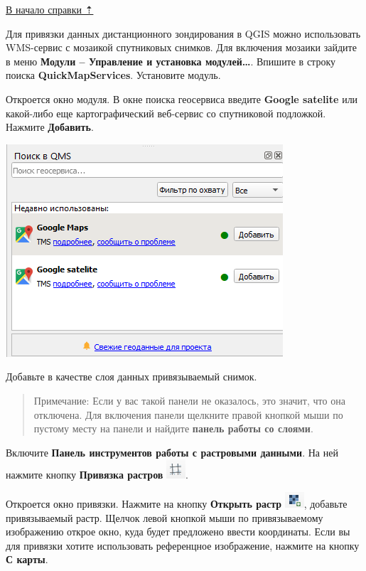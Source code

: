 \documentclass[
  12pt,
]{book}
\begin{document}
\protect\hyperlink{georeference}{В начало справки ⇡}

Для привязки данных дистанционного зондирования в QGIS можно использовать WMS-сервис с мозаикой спутниковых снимков. Для включения мозаики зайдите в меню \textbf{Модули -- Управление и установка модулей\ldots{}}. Впишите в строку поиска \textbf{QuickMapServices}. Установите модуль.

Откроется окно модуля. В окне поиска геосервиса введите \textbf{Google satelite} или какой-либо еще картографический веб-сервис со спутниковой подложкой. Нажмите \textbf{Добавить}.

\includegraphics{images/Ref02/QMS.png}

Добавьте в качестве слоя данных привязываемый снимок.

\begin{quote}
Примечание: Если у вас такой панели не оказалось, это значит, что она отключена. Для включения панели щелкните правой кнопкой мыши по пустому месту на панели и найдите \textbf{панель работы со слоями}.
\end{quote}

Включите \textbf{Панель инструментов работы с растровыми данными}. На ней нажмите кнопку \textbf{Привязка растров} \includegraphics{images/Ref02/Reference_button.png}.

Откроется окно привязки. Нажмите на кнопку \textbf{Открыть растр} \includegraphics{images/Ref02/Open_rastr.png}, добавьте привязываемый растр. Щелчок левой кнопкой мыши по привязываемому изображению открое окно, куда будет предложено ввести координаты. Если вы для привязки хотите использовать референцное изображение, нажмите на кнопку \textbf{С карты}.
\end{document}
